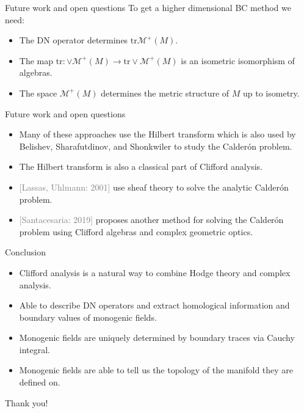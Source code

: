\documentclass[aspectratio=169]{beamer}
\newcommand\grey[1]{\textcolor{gray}{#1}}
\newcommand{\trace}{\mathrm{tr}}
\newcommand{\monogenics}{\mathcal{M}}
\begin{document}
\begin{frame}{Future work and open questions}
\vfill
\pause
To get a higher dimensional BC method we need:
\begin{itemize}
  \pause
  \item The DN operator determines $\trace \monogenics^+(M)$.
  \pause
  \item The map $\trace \colon \vee \monogenics^+(M) \to \trace \vee \monogenics^+(M)$ is an isometric isomorphism of algebras.
  \pause
  \item The space $\monogenics^+(M)$ determines the metric structure of $M$ up to isometry.
\end{itemize}
\vfill
\end{frame}


\begin{frame}{Future work and open questions}
\vfill
\begin{itemize}
  \pause
  \item Many of these approaches use the Hilbert transform which is also used by Belishev, Sharafutdinov, and Shonkwiler to study the Calder\'on problem.
  \pause
  \item The Hilbert transform is also a classical part of Clifford analysis.
  \pause
  \item \grey{[Lassas, Uhlmann: 2001]} use sheaf theory to solve the analytic Calder\'on problem.
  \pause
  \item \grey{[Santacesaria: 2019]} proposes another method for solving the Calder\'on problem using Clifford algebras and complex geometric optics.
\end{itemize}
\vfill
\end{frame}


\begin{frame}{Conclusion}
\vfill
\begin{itemize}
\pause
    \item Clifford analysis is a natural way to combine Hodge theory and complex analysis.
\pause
    \item Able to describe DN operators and extract homological information and boundary values of monogenic fields.
\pause
  \item Monogenic fields are uniquely determined by boundary traces via Cauchy integral.
\pause
    \item Monogenic fields are able to tell us the topology of the manifold they are defined on.
\end{itemize}
\vfill
\end{frame}


\begin{frame}{}
\vfill
\begin{center}
\large Thank you!
\end{center}
\vfill
\end{frame}
\end{document}
